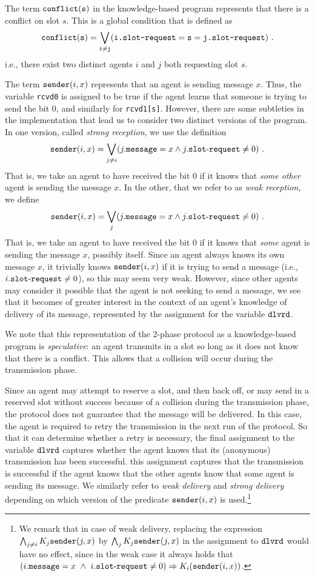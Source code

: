 \documentclass[]{llncs}
\newcommand{\dlvrd}{{\tt dlvrd}}
\newcommand{\sender}{{\tt sender}}
\newcommand{\rimp}{\Rightarrow}
\newcommand{\slotrequest}{{\tt slot\mbox{-}request}}
\newcommand{\msg}{{\tt message}}
\newcommand{\conflict}{\tt conflict}
\begin{document}
The term $\conflict(s)$ in the knowledge-based program 
represents that there is a conflict on slot $s$. 
This is a global condition that is defined as
$$ \conflict(s) = \bigvee_{i\neq j} (i\verb+.slot-request+= s= j\verb+.slot-request+)~.$$
i.e., there exist two distinct agents $i$ and $j$ both requesting slot $s$. 

The term $\sender(i,x)$ represents that an agent 
is sending message $x$.
Thus, the variable 
\verb+rcvd0+ is assigned to be true if the agent  learns that someone 
is trying to send the bit 0, and similarly for \verb+rcvd1[s]+. 
However, there are some subtleties in the implementation that lead us to consider 
two distinct versions of the program. 
In one version, called {\em strong reception}, we use the definition  
$$ \sender(i,x) = \bigvee_{j\neq i} (j.{\tt message} = x \land j.\slotrequest \neq 0)~.$$
That is, we take an agent to have received the bit $0$ if it knows that {\em some other} 
agent is sending the message $x$. In the other, that we refer to as {\em weak reception}, 
we define 
$$ \sender(i,x) = \bigvee_{j} (j.{\tt message} = x \land j.\slotrequest \neq 0)~.$$
That is, we take an agent to have received the bit $0$ if it knows that {\em some} 
agent is sending the message $x$, possibly itself. Since an agent always knows 
its own message $x$, it trivially knows $ \sender(i,x)$   if it is trying to send a message (i.e., $i.\slotrequest \neq 0$), 
so this may seem very weak. However, since other agents may consider it possible that the agent is 
not seeking to send a message, we see that it becomes of greater interest in the context of
an agent's knowledge of delivery of its message, represented by 
the assignment for the variable $\dlvrd$. 

We note that this representation of the 2-phase protocol as a 
knowledge-based program 
is {\em speculative}: an agent transmits in a slot so long as it does not know 
that there is a conflict. This allows that a collision will occur during the transmission phase. 
   
Since an agent may attempt to reserve a slot, and then back off, 
or may send in a reserved slot without success because of a collision during the transmission phase, the protocol does not 
guarantee that the message will be delivered. In this case, the 
agent is required to retry the transmission in the next run of the protocol. 
So  that  it can determine whether a retry is necessary, the final assignment 
to the variable $\dlvrd$ captures  whether the agent knows that 
its (anonymous) transmission has been successful. this assignment captures that 
the transmission is successful if the agent knows that the other agents
know that some agent is sending its message.  
We similarly refer to {\em weak delivery} and {\em strong delivery}  
depending on which version of the predicate $ \sender(i,x)$ is used.\footnote{We remark that in case of weak delivery, replacing the expression $\bigwedge_{j\neq i} K_j\sender(j,x)$
by $\bigwedge_{j} K_j\sender(j,x)$ in the assignment to $\dlvrd$ would have no effect, since in the weak case it always holds 
that $(i.\msg = x ~ \land ~i.\slotrequest \neq 0 )\rimp K_i (\sender(i,x)) $.
} 
\end{document}
